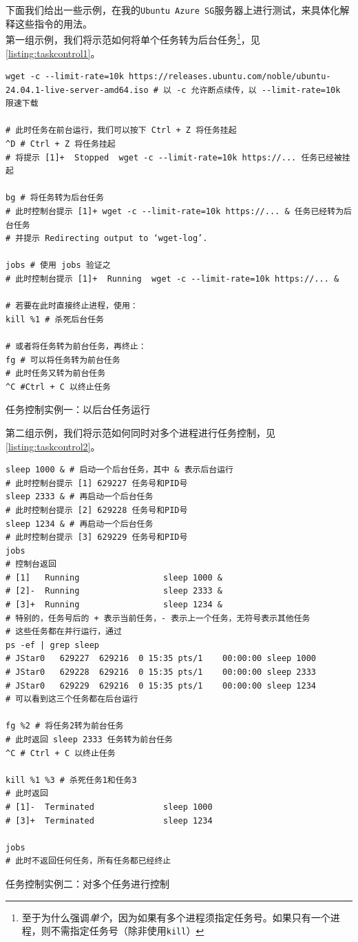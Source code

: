 下面我们给出一些示例，在我的\texttt{Ubuntu Azure SG}服务器上进行测试，来具体化解释这些指令的用法。\\

第一组示例，我们将示范如何将单个任务转为后台任务\footnote{至于为什么强调\textit{单个}，因为如果有多个进程须指定任务号。如果只有一个进程，则不需指定任务号（除非使用\texttt{kill}）}，见\autoref{listing:taskcontrol1}。

\begin{longlisting}
    \begin{verbatim}
wget -c --limit-rate=10k https://releases.ubuntu.com/noble/ubuntu-24.04.1-live-server-amd64.iso # 以 -c 允许断点续传，以 --limit-rate=10k 限速下载

# 此时任务在前台运行，我们可以按下 Ctrl + Z 将任务挂起
^D # Ctrl + Z 将任务挂起
# 将提示 [1]+  Stopped  wget -c --limit-rate=10k https://... 任务已经被挂起

bg # 将任务转为后台任务
# 此时控制台提示 [1]+ wget -c --limit-rate=10k https://... & 任务已经转为后台任务
# 并提示 Redirecting output to ‘wget-log’.

jobs # 使用 jobs 验证之
# 此时控制台提示 [1]+  Running  wget -c --limit-rate=10k https://... &

# 若要在此时直接终止进程，使用：
kill %1 # 杀死后台任务

# 或者将任务转为前台任务，再终止：
fg # 可以将任务转为前台任务
# 此时任务又转为前台任务
^C #Ctrl + C 以终止任务
    \end{verbatim}
    \caption{任务控制实例一：以后台任务运行}
    \label{listing:taskcontrol1}
\end{longlisting}

第二组示例，我们将示范如何同时对多个进程进行任务控制，见\autoref{listing:taskcontrol2}。

\begin{longlisting}
    \begin{verbatim}
sleep 1000 & # 启动一个后台任务，其中 & 表示后台运行
# 此时控制台提示 [1] 629227 任务号和PID号
sleep 2333 & # 再启动一个后台任务
# 此时控制台提示 [2] 629228 任务号和PID号
sleep 1234 & # 再启动一个后台任务
# 此时控制台提示 [3] 629229 任务号和PID号
jobs
# 控制台返回
# [1]   Running                 sleep 1000 &
# [2]-  Running                 sleep 2333 &
# [3]+  Running                 sleep 1234 &
# 特别的，任务号后的 + 表示当前任务，- 表示上一个任务，无符号表示其他任务
# 这些任务都在并行运行，通过
ps -ef | grep sleep
# JStar0   629227  629216  0 15:35 pts/1    00:00:00 sleep 1000
# JStar0   629228  629216  0 15:35 pts/1    00:00:00 sleep 2333
# JStar0   629229  629216  0 15:35 pts/1    00:00:00 sleep 1234
# 可以看到这三个任务都在后台运行

fg %2 # 将任务2转为前台任务
# 此时返回 sleep 2333 任务转为前台任务
^C # Ctrl + C 以终止任务

kill %1 %3 # 杀死任务1和任务3
# 此时返回
# [1]-  Terminated              sleep 1000
# [3]+  Terminated              sleep 1234

jobs
# 此时不返回任何任务，所有任务都已经终止
    \end{verbatim}
    \caption{任务控制实例二：对多个任务进行控制}
    \label{listing:taskcontrol2}
\end{longlisting}

